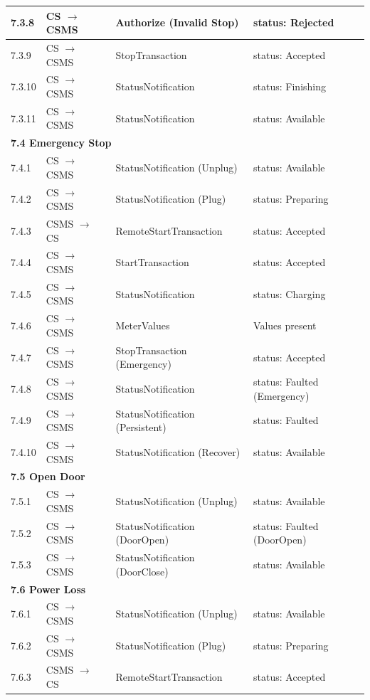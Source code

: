 \documentclass[a4paper,11pt]{report}
\begin{document}
\begin{footnotesize}
\begin{longtable}{|p{1.2cm}|p{2.5cm}|p{5.5cm}|p{6cm}|}
\hline
7.3.8 & CS $\to$ CSMS & Authorize (Invalid Stop) & status: Rejected \\
\hline
7.3.9 & CS $\to$ CSMS & StopTransaction & status: Accepted \\
\hline
7.3.10 & CS $\to$ CSMS & StatusNotification & status: Finishing \\
\hline
7.3.11 & CS $\to$ CSMS & StatusNotification & status: Available \\
\hline
\multicolumn{4}{|l|}{\textbf{7.4 Emergency Stop}} \\
\hline
7.4.1 & CS $\to$ CSMS & StatusNotification (Unplug) & status: Available \\
\hline
7.4.2 & CS $\to$ CSMS & StatusNotification (Plug) & status: Preparing \\
\hline
7.4.3 & CSMS $\to$ CS & RemoteStartTransaction & status: Accepted \\
\hline
7.4.4 & CS $\to$ CSMS & StartTransaction & status: Accepted \\
\hline
7.4.5 & CS $\to$ CSMS & StatusNotification & status: Charging \\
\hline
7.4.6 & CS $\to$ CSMS & MeterValues & Values present \\
\hline
7.4.7 & CS $\to$ CSMS & StopTransaction (Emergency) & status: Accepted \\
\hline
7.4.8 & CS $\to$ CSMS & StatusNotification & status: Faulted (Emergency) \\
\hline
7.4.9 & CS $\to$ CSMS & StatusNotification (Persistent) & status: Faulted \\
\hline
7.4.10 & CS $\to$ CSMS & StatusNotification (Recover) & status: Available \\
\hline
\multicolumn{4}{|l|}{\textbf{7.5 Open Door}} \\
\hline
7.5.1 & CS $\to$ CSMS & StatusNotification (Unplug) & status: Available \\
\hline
7.5.2 & CS $\to$ CSMS & StatusNotification (DoorOpen) & status: Faulted (DoorOpen) \\
\hline
7.5.3 & CS $\to$ CSMS & StatusNotification (DoorClose) & status: Available \\
\hline
\multicolumn{4}{|l|}{\textbf{7.6 Power Loss}} \\
\hline
7.6.1 & CS $\to$ CSMS & StatusNotification (Unplug) & status: Available \\
\hline
7.6.2 & CS $\to$ CSMS & StatusNotification (Plug) & status: Preparing \\
\hline
7.6.3 & CSMS $\to$ CS & RemoteStartTransaction & status: Accepted \\

\end{longtable}
\end{footnotesize}
\end{document}
